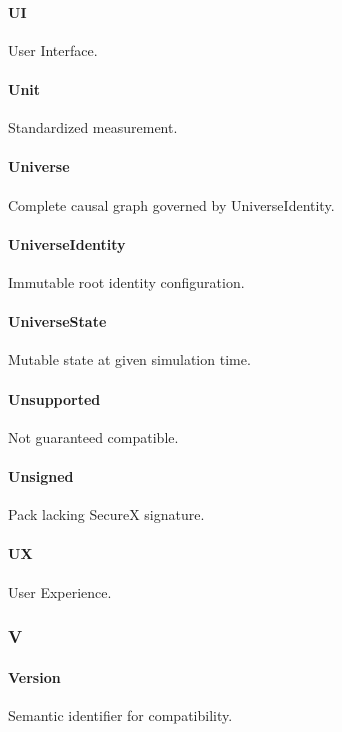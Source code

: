 \documentclass[9pt,a4paper,openany]{book}
\begin{document}
\paragraph{UI}
User Interface.\allowbreak{}


\paragraph{Unit}
Standardized measurement.\allowbreak{}


\paragraph{Universe}
Complete causal graph governed by UniverseIdentity.\allowbreak{}


\paragraph{UniverseIdentity}
Immutable root identity configuration.\allowbreak{}


\paragraph{UniverseState}
Mutable state at given simulation time.\allowbreak{}


\paragraph{Unsupported}
Not guaranteed compatible.\allowbreak{}


\paragraph{Unsigned}
Pack lacking SecureX signature.\allowbreak{}


\paragraph{UX}
User Experience.\allowbreak{}


\subsubsection{V}

\paragraph{Version}
Semantic identifier for compatibility.\allowbreak{}
\end{document}
